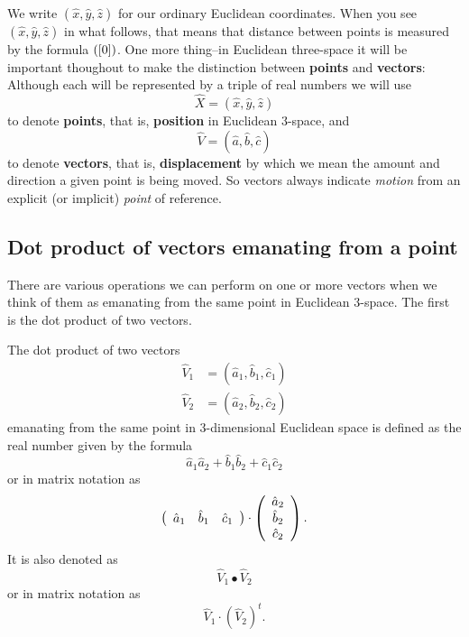 \documentclass{ximera}
\begin{document}
We write $\left(  \hat{x},\hat{y},\hat{z}\right)  $ for our ordinary Euclidean
coordinates. When you see $\left(  \hat{x},\hat{y},\hat{z}\right)  $ in what
follows, that means that distance between points is measured by the formula
$\left(  \ref{0}\right)  $. One more thing--in Euclidean three-space it will
be important thoughout to make the distinction between \textbf{points} and
\textbf{vectors}: Although each will be represented by a triple of real
numbers we will use%
\[
\hat{X}=\left(  \hat{x},\hat{y},\hat{z}\right)
\]
to denote \textbf{points}, that is, \textbf{position} in Euclidean $3$-space,
and%
\[
\hat{V}=\left(  \hat{a},\hat{b},\hat{c}\right)
\]
to denote \textbf{vectors}, that is, \textbf{displacement} by which we mean
the amount and direction a given point is being moved. So vectors always
indicate \textit{motion} from an explicit (or implicit) \textit{point} of
reference. 

\subsection*{Dot product of vectors emanating from a point}

There are various operations we can perform on one or more vectors when we
think of them as emanating from the same point in Euclidean $3$-space. The
first is the dot product of two vectors.

\begin{definition}
The dot product of two vectors%
\begin{align*}
\hat{V}_{1}  &  =\left(  \hat{a}_{1},\hat{b}_{1},\hat{c}_{1}\right) \\
\hat{V}_{2}  &  =\left(  \hat{a}_{2},\hat{b}_{2},\hat{c}_{2}\right)
\end{align*}
emanating from the same point in 3-dimensional Euclidean space is
defined as the real number given by the formula%
\[
\hat{a}_{1}\hat{a}_{2}+\hat{b}_{1}\hat{b}_{2}+\hat{c}_{1}\hat{c}_{2}%
\]
or in matrix notation as%
\[
\left(
\begin{array}
[c]{ccc}%
\hat{a}_{1} & \hat{b}_{1} & \hat{c}_{1}%
\end{array}
\right)  \cdot\left(
\begin{array}
[c]{c}%
\hat{a}_{2}\\
\hat{b}_{2}\\
\hat{c}_{2}%
\end{array}
\right)  .
\]
It is also denoted as%
\[
\hat{V}_{1}\bullet\hat{V}_{2}%
\]
or in matrix notation as%
\[
\hat{V}_{1}\cdot\left(  \hat{V}_{2}\right)  ^{t}.
\]

\end{definition}
\end{document}

